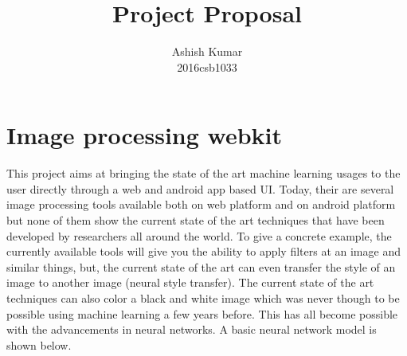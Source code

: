 \documentclass[journal]{IEEEtran}
\begin{document}
\title{Project Proposal}

\author{

Ashish Kumar\\
2016csb1033

}

\maketitle


\section{\textbf{Image processing webkit}}
This project aims at bringing the state of the art machine learning usages to the user directly through a web and android app based UI. Today, their are several image processing tools available both on web platform and on android platform but none of them show the current state of the art techniques that have been developed by researchers all around the world. To give a concrete example, the currently available tools will give you the ability to apply filters at an image and similar things, but, the current state of the art can even transfer the style of an image to another image (neural style transfer). The current state of the art techniques can also color a black and white image which was never though to be possible using machine learning a few years before. This has all become possible with the advancements in neural networks. A basic neural network model is shown below.
\\



 
\end{document}
